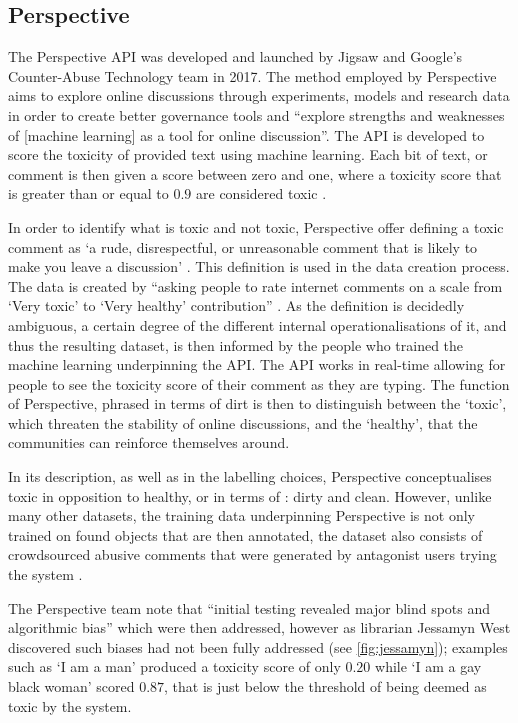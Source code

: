 \subsection{Perspective}\label{sub:perspective}

The Perspective API was developed \cite{Wulczyn:2017} and launched by Jigsaw and Google's Counter-Abuse Technology team in 2017. The method employed by Perspective aims to explore online discussions through experiments, models and research data in order to create better governance tools and ``explore strengths and weaknesses of [machine learning] as a tool for online discussion''. The API is developed to score the toxicity of provided text using machine learning. Each bit of text, or comment is then given a score between zero and one, where a toxicity score that is greater than or equal to $0.9$ are considered toxic \cite{Find the page that mentions this}.

In order to identify what is toxic and not toxic, Perspective offer defining a toxic comment as ‘a rude, disrespectful, or unreasonable comment that is likely to make you leave a discussion' \cite{PerspectiveAPI}. This definition is used in the data creation process. The data is created by ``asking people to rate internet comments on a scale from `Very toxic' to `Very healthy' contribution'' \cite{Gomes:2018}. As the definition is decidedly ambiguous, a certain degree of the different internal operationalisations of it, and thus the resulting dataset, is then informed by the people who trained the machine learning underpinning the API. The API works in real-time allowing for people to see the toxicity score of their comment as they are typing. The function of Perspective, phrased in terms of dirt is then to distinguish between the `toxic', which threaten the stability of online discussions, and the `healthy', that the communities can reinforce themselves around.\vspace{5mm}

In its description, as well as in the labelling choices, Perspective conceptualises toxic in opposition to healthy, or in terms of \citet{Douglas:1966}: dirty and clean. However, unlike many other datasets, the training data underpinning Perspective is not only trained on found objects that are then annotated, the dataset also consists of crowdsourced abusive comments that were generated by antagonist users trying the system \cite{Marvin:2019}. \vspace{5mm}

The Perspective team note that ``initial testing revealed major blind spots and algorithmic bias'' \cite{Marvin:2019} which were then addressed, however as librarian Jessamyn West discovered such biases had not been fully addressed (see \autoref{fig:jessamyn}); examples such as `I am a man' produced a toxicity score of only $0.20$ while `I am a gay black woman' scored $0.87$, that is just below the threshold of being deemed as toxic by the system.

